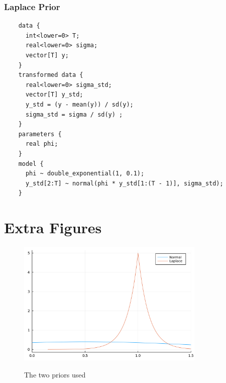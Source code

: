\documentclass{article}
\theoremstyle{definition}
\theoremstyle{exercise}
\theoremstyle{remark}
\begin{document}
\subsubsection*{Laplace Prior}
\begin{verbatim}
    data {
      int<lower=0> T;
      real<lower=0> sigma;
      vector[T] y;
    }
    transformed data {
      real<lower=0> sigma_std;
      vector[T] y_std;
      y_std = (y - mean(y)) / sd(y);
      sigma_std = sigma / sd(y) ;
    }
    parameters {
      real phi;
    }
    model {
      phi ~ double_exponential(1, 0.1);
      y_std[2:T] ~ normal(phi * y_std[1:(T - 1)], sigma_std);
    }
\end{verbatim}
\section{Extra Figures}%
\begin{figure}[H]
    \centering
    {\includegraphics[width=0.8\textwidth]{./plots/priors.png}}
    \caption{The two priors used}
    \label{eq:priors}
\end{figure}



\end{document}
